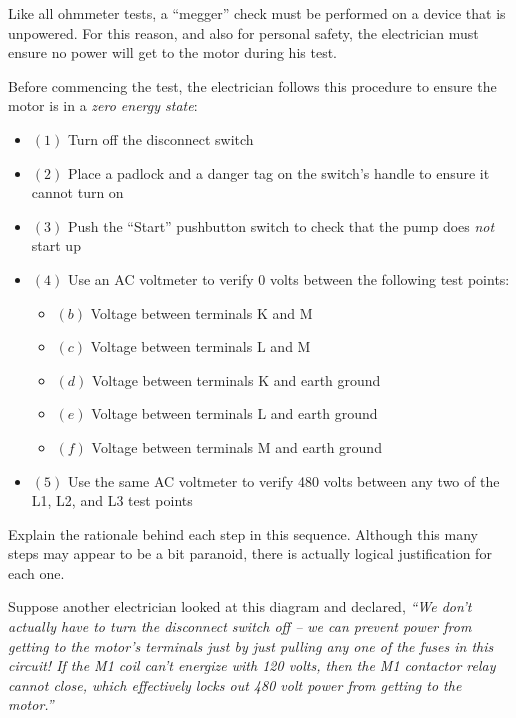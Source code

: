 Like all ohmmeter tests, a ``megger'' check must be performed on a device that is unpowered.  For this reason, and also for personal safety, the electrician must ensure no power will get to the motor during his test.

\vskip 10pt

Before commencing the test, the electrician follows this procedure to ensure the motor is in a {\it zero energy state}:

\begin{itemize}
\item{$(1)$} Turn off the disconnect switch
\item{$(2)$} Place a padlock and a danger tag on the switch's handle to ensure it cannot turn on
\item{$(3)$} Push the ``Start'' pushbutton switch to check that the pump does {\it not} start up
\item{$(4)$} Use an AC voltmeter to verify 0 volts between the following test points:
\begin{itemize}

\item{$(b)$} Voltage between terminals K and M
\item{$(c)$} Voltage between terminals L and M
\item{$(d)$} Voltage between terminals K and earth ground
\item{$(e)$} Voltage between terminals L and earth ground
\item{$(f)$} Voltage between terminals M and earth ground
\end{itemize}
\item{$(5)$} Use the same AC voltmeter to verify 480 volts between any two of the L1, L2, and L3 test points
\end{itemize}

\vskip 10pt

Explain the rationale behind each step in this sequence.  Although this many steps may appear to be a bit paranoid, there is actually logical justification for each one.

\vskip 10pt

Suppose another electrician looked at this diagram and declared, {\it ``We don't actually have to turn the disconnect switch off -- we can prevent power from getting to the motor's terminals just by just pulling any one of the fuses in this circuit!  If the M1 coil can't energize with 120 volts, then the M1 contactor relay cannot close, which effectively locks out 480 volt power from getting to the motor.''}

